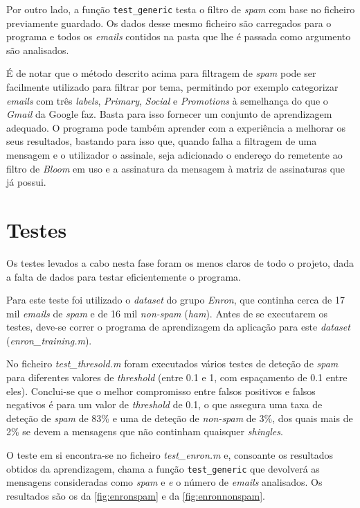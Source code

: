 \documentclass[a4paper,11pt,openright,oneside]{report}
\begin{document}
Por outro lado, a função \texttt{test\_generic} testa o filtro de \textit{spam} com base no ficheiro previamente guardado. Os dados desse mesmo ficheiro são carregados para o programa e todos os \textit{emails} contidos na pasta que lhe é passada como argumento são analisados.

É de notar que o método descrito acima para filtragem de \textit{spam} pode ser facilmente utilizado para filtrar por tema, permitindo por exemplo categorizar \textit{emails} com três \textit{labels}, \textit{Primary}, \textit{Social} e \textit{Promotions} à semelhança do que o \textit{Gmail} da Google faz. Basta para isso fornecer um conjunto de aprendizagem adequado. O programa pode também aprender com a experiência a melhorar os seus resultados, bastando para isso que, quando falha a filtragem de uma mensagem e o utilizador o assinale, seja adicionado o endereço do remetente ao filtro de \textit{Bloom} em uso e a assinatura da mensagem à matriz de assinaturas que já possui.

\section{Testes}

Os testes levados a cabo nesta fase foram os menos claros de todo o projeto, dada a falta de dados para testar eficientemente o programa.

Para este teste foi utilizado o \textit{dataset} do grupo \textit{Enron}, que continha cerca de 17 mil \textit{emails} de \textit{spam} e de 16 mil \textit{non-spam} (\textit{ham}). Antes de se executarem os testes, deve-se correr o programa de aprendizagem da aplicação para este \textit{dataset} (\textit{enron\_training.m}).

No ficheiro \textit{test\_thresold.m} foram executados vários testes de deteção de \textit{spam} para diferentes valores de \textit{threshold} (entre 0.1 e 1, com espaçamento de 0.1 entre eles). Conclui-se que o melhor compromisso entre falsos positivos e falsos negativos é para um valor de \textit{threshold} de 0.1, o que assegura uma taxa de deteção de \textit{spam} de 83\% e uma de deteção de \textit{non-spam} de 3\%, dos quais mais de 2\% se devem a mensagens que não continham quaisquer \textit{shingles}.

O teste em si encontra-se no ficheiro \textit{test\_enron.m} e, consoante os resultados obtidos da aprendizagem, chama a função \texttt{test\_generic} que devolverá as mensagens consideradas como \textit{spam} e \textit e o número de \textit{emails} analisados. Os resultados são os da \autoref{fig:enronspam} e da \autoref{fig:enronnonspam}.
\end{document}
